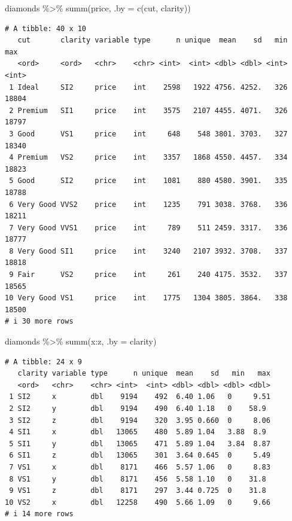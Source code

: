 \documentclass[
  letterpaper,
]{ctexbook}
\newenvironment{Shaded}{\begin{snugshade}}{\end{snugshade}}
\newcommand{\AttributeTok}[1]{\textcolor[rgb]{0.40,0.45,0.13}{#1}}
\newcommand{\FunctionTok}[1]{\textcolor[rgb]{0.28,0.35,0.67}{#1}}
\newcommand{\NormalTok}[1]{\textcolor[rgb]{0.00,0.23,0.31}{#1}}
\newcommand{\SpecialCharTok}[1]{\textcolor[rgb]{0.37,0.37,0.37}{#1}}
\begin{document}
\begin{Shaded}
\begin{Highlighting}[]
\NormalTok{diamonds }\SpecialCharTok{\%\textgreater{}\%}
  \FunctionTok{summ}\NormalTok{(price, }\AttributeTok{.by =} \FunctionTok{c}\NormalTok{(cut, clarity))}
\end{Highlighting}
\end{Shaded}

\begin{verbatim}
# A tibble: 40 x 10
   cut       clarity variable type      n unique  mean    sd   min   max
   <ord>     <ord>   <chr>    <chr> <int>  <int> <dbl> <dbl> <int> <int>
 1 Ideal     SI2     price    int    2598   1922 4756. 4252.   326 18804
 2 Premium   SI1     price    int    3575   2107 4455. 4071.   326 18797
 3 Good      VS1     price    int     648    548 3801. 3703.   327 18340
 4 Premium   VS2     price    int    3357   1868 4550. 4457.   334 18823
 5 Good      SI2     price    int    1081    880 4580. 3901.   335 18788
 6 Very Good VVS2    price    int    1235    791 3038. 3768.   336 18211
 7 Very Good VVS1    price    int     789    511 2459. 3317.   336 18777
 8 Very Good SI1     price    int    3240   2107 3932. 3708.   337 18818
 9 Fair      VS2     price    int     261    240 4175. 3532.   337 18565
10 Very Good VS1     price    int    1775   1304 3805. 3864.   338 18500
# i 30 more rows
\end{verbatim}

\begin{Shaded}
\begin{Highlighting}[]
\NormalTok{diamonds }\SpecialCharTok{\%\textgreater{}\%}
  \FunctionTok{summ}\NormalTok{(x}\SpecialCharTok{:}\NormalTok{z, }\AttributeTok{.by =}\NormalTok{ clarity)}
\end{Highlighting}
\end{Shaded}

\begin{verbatim}
# A tibble: 24 x 9
   clarity variable type      n unique  mean    sd   min   max
   <ord>   <chr>    <chr> <int>  <int> <dbl> <dbl> <dbl> <dbl>
 1 SI2     x        dbl    9194    492  6.40 1.06   0     9.51
 2 SI2     y        dbl    9194    490  6.40 1.18   0    58.9 
 3 SI2     z        dbl    9194    320  3.95 0.660  0     8.06
 4 SI1     x        dbl   13065    480  5.89 1.04   3.88  8.9 
 5 SI1     y        dbl   13065    471  5.89 1.04   3.84  8.87
 6 SI1     z        dbl   13065    301  3.64 0.645  0     5.49
 7 VS1     x        dbl    8171    466  5.57 1.06   0     8.83
 8 VS1     y        dbl    8171    456  5.58 1.10   0    31.8 
 9 VS1     z        dbl    8171    297  3.44 0.725  0    31.8 
10 VS2     x        dbl   12258    490  5.66 1.09   0     9.66
# i 14 more rows
\end{verbatim}
\end{document}
